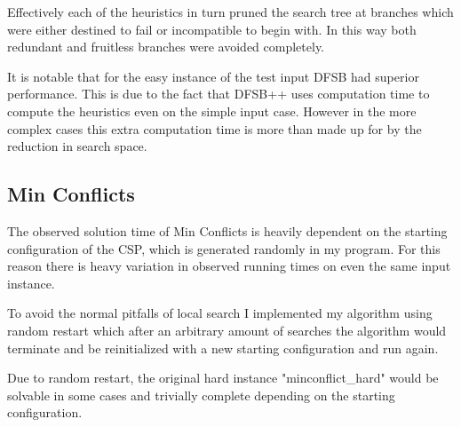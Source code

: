 \documentclass[11pt, oneside]{article}   	%
\begin{document}
Effectively each of the heuristics in turn pruned the search tree at branches which were either destined to fail or incompatible to begin with.  In this way both redundant and fruitless branches were avoided completely.

It is notable that for the easy instance of the test input DFSB had superior performance.  This is due to the fact that DFSB++ uses computation time to compute the heuristics even on the simple input case.  However in the more complex cases this extra computation time is more than made up for by the reduction in search space.

\subsection{Min Conflicts}
The observed solution time of Min Conflicts is heavily dependent on the starting configuration of the CSP, which is generated randomly in my program.  For this reason there is heavy variation in observed running times on even the same input instance.

To avoid the normal pitfalls of local search I implemented my algorithm using random restart which after an arbitrary amount of searches the algorithm would terminate and be reinitialized with a new starting configuration and run again.

Due to random restart, the original hard instance "minconflict\_hard" would be solvable in some cases and trivially complete depending on the starting configuration.
\end{document}
